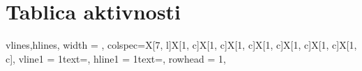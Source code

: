 		\eject
		\section*{Tablica aktivnosti}
		
			

			\begin{longtblr}[
					label=none,
				]{
					vlines,hlines,
					width = \textwidth,
					colspec={X[7, l]X[1, c]X[1, c]X[1, c]X[1, c]X[1, c]X[1, c]X[1, c]}, 
					vline{1} = {1}{text=\clap{}},
					hline{1} = {1}{text=\clap{}},
					rowhead = 1,
				} 
				

\end{longtblr}
